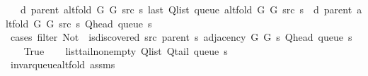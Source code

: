 \begin{isabellebody}
\ \ \ {\isachardoublequoteopen}d\ {\isacharparenleft}{\kern0pt}parent\ {\isacharparenleft}{\kern0pt}alt{\isacharunderscore}{\kern0pt}fold\ G{}\ G{}\ src\ s{\isacharparenright}{\kern0pt}{\isacharparenright}{\kern0pt}\ {\isacharparenleft}{\kern0pt}last\ {\isacharparenleft}{\kern0pt}Q{\isacharunderscore}{\kern0pt}list\ {\isacharparenleft}{\kern0pt}queue\ {\isacharparenleft}{\kern0pt}alt{\isacharunderscore}{\kern0pt}fold\ G{}\ G{}\ src\ s{\isacharparenright}{\kern0pt}{\isacharparenright}{\kern0pt}{\isacharparenright}{\kern0pt}{\isacharparenright}{\kern0pt}\ {\isasymle}\ d\ {\isacharparenleft}{\kern0pt}parent\ {\isacharparenleft}{\kern0pt}alt{\isacharunderscore}{\kern0pt}fold\ G{}\ G{}\ src\ s{\isacharparenright}{\kern0pt}{\isacharparenright}{\kern0pt}\ {\isacharparenleft}{\kern0pt}Q{\isacharunderscore}{\kern0pt}head\ {\isacharparenleft}{\kern0pt}queue\ s{\isacharparenright}{\kern0pt}{\isacharparenright}{\kern0pt}\ {\isacharplus}{\kern0pt}\ {}{\isachardoublequoteclose}%
\endisataginvisible
{\isafoldinvisible}%
%
\isadeliminvisible
\isanewline
%
\endisadeliminvisible
%
\isadelimproof
%
\endisadelimproof
%
\isatagproof
{}\isamarkupfalse%
\ {\isacharparenleft}{\kern0pt}cases\ {\isachardoublequoteopen}filter\ {\isacharparenleft}{\kern0pt}Not\ {\isasymcirc}\ is{\isacharunderscore}{\kern0pt}discovered\ src\ {\isacharparenleft}{\kern0pt}parent\ s{\isacharparenright}{\kern0pt}{\isacharparenright}{\kern0pt}\ {\isacharparenleft}{\kern0pt}adjacency\ G{}\ G{}\ s\ {\isacharparenleft}{\kern0pt}Q{\isacharunderscore}{\kern0pt}head\ {\isacharparenleft}{\kern0pt}queue\ s{\isacharparenright}{\kern0pt}{\isacharparenright}{\kern0pt}{\isacharparenright}{\kern0pt}\ {\isacharequal}{\kern0pt}\ {\isacharbrackleft}{\kern0pt}{\isacharbrackright}{\kern0pt}{\isachardoublequoteclose}{\isacharparenright}{\kern0pt}\isanewline
\ \ \isamarkupfalse%
\ True\isanewline
\ \ \isamarkupfalse%
\ list{\isacharunderscore}{\kern0pt}tail{\isacharunderscore}{\kern0pt}non{\isacharunderscore}{\kern0pt}empty{\isacharcolon}{\kern0pt}\ {\isachardoublequoteopen}Q{\isacharunderscore}{\kern0pt}list\ {\isacharparenleft}{\kern0pt}Q{\isacharunderscore}{\kern0pt}tail\ {\isacharparenleft}{\kern0pt}queue\ s{\isacharparenright}{\kern0pt}{\isacharparenright}{\kern0pt}\ {\isasymnoteq}\ {\isacharbrackleft}{\kern0pt}{\isacharbrackright}{\kern0pt}{\isachardoublequoteclose}\isanewline
\ \ \ \ \isamarkupfalse%
\ invar{\isacharunderscore}{\kern0pt}queue{\isacharunderscore}{\kern0pt}alt{\isacharunderscore}{\kern0pt}fold\ assms\isanewline

\end{isabellebody}
